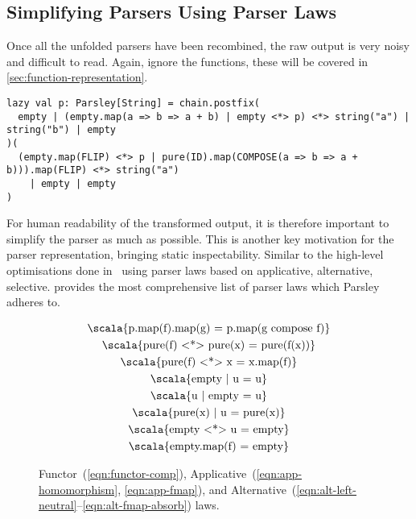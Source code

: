 \documentclass[../../main.tex]{subfiles}
\begin{document}
\subsection{Simplifying Parsers Using Parser Laws}
Once all the unfolded parsers have been recombined, the raw output is very noisy and difficult to read.
Again, ignore the functions, these will be covered in \cref{sec:function-representation}.
\begin{verbatim}
lazy val p: Parsley[String] = chain.postfix(
  empty | (empty.map(a => b => a + b) | empty <*> p) <*> string("a") | string("b") | empty
)(
  (empty.map(FLIP) <*> p | pure(ID).map(COMPOSE(a => b => a + b))).map(FLIP) <*> string("a")
    | empty | empty
)
\end{verbatim}
%
For human readability of the transformed output, it is therefore important to simplify the parser as much as possible.
This is another key motivation for the parser representation, bringing static inspectability.
Similar to the high-level optimisations done in~\cite{willis_staged_2023} using parser laws based on applicative, alternative, selective.
\textcite{willis_parsley_2023} provides the most comprehensive list of parser laws which Parsley adheres to.

\begin{figure}[htbp]
\centering
\begin{gather}
  \text{\scala{p.map(f).map(g) = p.map(g compose f)}} \label{eqn:functor-comp} \\
  \text{\scala{pure(f) <*> pure(x) = pure(f(x))}} \label{eqn:app-homomorphism} \\
  \text{\scala{pure(f) <*> x = x.map(f)}} \label{eqn:app-fmap} \\
  \text{\scala{empty | u = u}} \label{eqn:alt-left-neutral} \\
  \text{\scala{u | empty = u}} \label{eqn:alt-right-neutral} \\
  \text{\scala{pure(x) | u = pure(x)}} \label{eqn:alt-left-biased-choice} \\
  \text{\scala{empty <*> u = empty}} \label{eqn:alt-empty-absorb} \\
  \text{\scala{empty.map(f) = empty}} \label{eqn:alt-fmap-absorb}
\end{gather}
\caption{Functor~(\ref{eqn:functor-comp}), Applicative~(\ref{eqn:app-homomorphism}, \ref{eqn:app-fmap}), and Alternative~(\ref{eqn:alt-left-neutral}--\ref{eqn:alt-fmap-absorb}) laws.}
\label{fig:parser-laws}
\end{figure}
\end{document}
